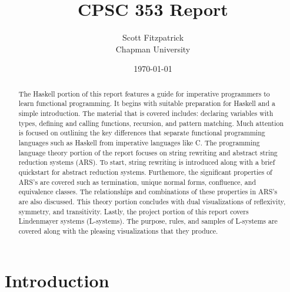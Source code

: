 \documentclass{article}
\title{CPSC 353 Report}
\author{Scott Fitzpatrick  \\ Chapman University}
\date{\today}
\begin{document}
\maketitle

\begin{abstract}
The Haskell portion of this report features a guide for imperative programmers to learn functional programming. It begins with suitable preparation for Haskell and a simple introduction. The material that is covered includes: declaring variables with types, defining and calling functions, recursion, and pattern matching. Much attention is focused on outlining the key differences that separate functional programming languages such as Haskell from imperative languages like C. The programming language theory portion of the report focuses on string rewriting and abstract string reduction systems (ARS). To start, string rewriting is introduced along with a brief quickstart for abstract reduction systems. Furthemore, the significant properties of ARS's are covered such as termination, unique normal forms, confluence, and equivalence classes. The relationships and combinations of these properties in ARS's are also discussed. This theory portion concludes with dual visualizations of reflexivity, symmetry, and transitivity. Lastly, the project portion of this report covers Lindenmayer systems (L-systems). The purpose, rules, and samples of L-systems are covered along with the pleasing visualizations that they produce.
\end{abstract}

\tableofcontents

\section{Introduction}\label{intro}
\end{document}
